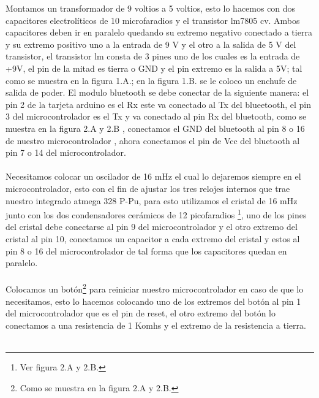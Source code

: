 \documentclass[12]{article}
\begin{document}
\begin{multicols}{2}
Montamos un transformador de 9 voltios a 5 voltios, esto lo hacemos con dos capacitores electrolíticos de 10 microfaradios  y el transistor lm7805\cite{REGULADOR} cv. Ambos  capacitores deben ir en paralelo quedando su extremo negativo conectado a tierra y su extremo positivo uno a la entrada de 9 V y el otro a la salida de 5 V del transistor, el transistor lm consta de 3 pines uno de los cuales es la entrada de +9V, el pin de la mitad es tierra o GND y el pin extremo es la salida a 5V; tal como se muestra en la figura 1.A.; en la figura 1.B. se le coloco un enchufe de salida de poder.
El modulo bluetooth se debe conectar de la siguiente manera: el pin 2 de la tarjeta arduino es el Rx este va conectado al Tx del blueetooth, el pin 3 del microcontrolador es el Tx y va conectado al pin Rx del bluetooth, como se muestra en la figura 2.A y 2.B , conectamos el GND del bluetooth al pin 8  o 16 de nuestro microcontrolador , ahora conectamos el pin de Vcc del bluetooth al pin 7 o 14 del microcontrolador. \\\\
Necesitamos colocar un oscilador de 16 mHz el cual lo dejaremos siempre en el microcontrolador, esto  con el fin de ajustar los tres relojes internos que trae nuestro integrado atmega 328 P-Pu, para esto utilizamos el cristal de 16 mHz junto con los dos condensadores cerámicos de 12 picofaradios \footnote{Ver figura 2.A y 2.B.}, uno de los pines del cristal debe conectarse al pin 9 del microcontrolador y el otro extremo del cristal al pin 10, conectamos un capacitor a cada extremo del cristal y estos al pin 8 o 16 del microcontrolador de tal forma que los capacitores quedan en paralelo. \\\\
Colocamos un botón\footnote{Como se muestra en la figura 2.A y 2.B.} para reiniciar nuestro microcontrolador en caso de que lo necesitamos, esto lo hacemos colocando uno de los extremos del botón al pin 1 del microcontrolador que es el pin de reset, el otro extremo del botón lo conectamos a una resistencia de 1 Komhs y el extremo de la resistencia a tierra.\\\\


\end{multicols}
\end{document}

